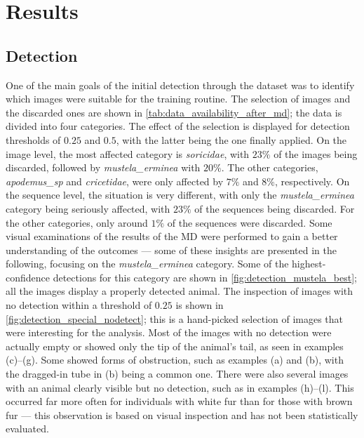 

\section{Results}
\label{results}

\subsection{Detection}
One of the main goals of the initial detection through the dataset was to identify which images were suitable for the training routine.
The selection of images and the discarded ones are shown in \autoref{tab:data_availability_after_md}; the data is divided into four categories.
The effect of the selection is displayed for detection thresholds of \(0.25\) and \(0.5\), with the latter being the one finally applied.
On the image level, the most affected category is \textit{soricidae}, with \(23\%\) of the images being discarded, followed by \textit{mustela\_erminea} with \(20\%\).
The other categories, \textit{apodemus\_sp} and \textit{cricetidae}, were only affected by \(7\%\) and \(8\%\), respectively.
On the sequence level, the situation is very different, with only the \textit{mustela\_erminea} category being seriously affected, with \(23\%\) of the sequences being discarded.
For the other categories, only around \(1\%\) of the sequences were discarded.
Some visual examinations of the results of the \ac{MD} were performed to gain a better understanding of the outcomes --- some of these insights are presented in the following, focusing on the \textit{mustela\_erminea} category.
Some of the highest-confidence detections for this category are shown in \autoref{fig:detection_mustela_best}; all the images display a properly detected animal.
The inspection of images with no detection within a threshold of \(0.25\) is shown in \autoref{fig:detection_special_nodetect}; this is a hand-picked selection of images that were interesting for the analysis.
Most of the images with no detection were actually empty or showed only the tip of the animal's tail, as seen in examples (c)--(g).
Some showed forms of obstruction, such as examples (a) and (b), with the dragged-in tube in (b) being a common one.
There were also several images with an animal clearly visible but no detection, such as in examples (h)--(l).
This occurred far more often for individuals with white fur than for those with brown fur --- this observation is based on visual inspection and has not been statistically evaluated.

